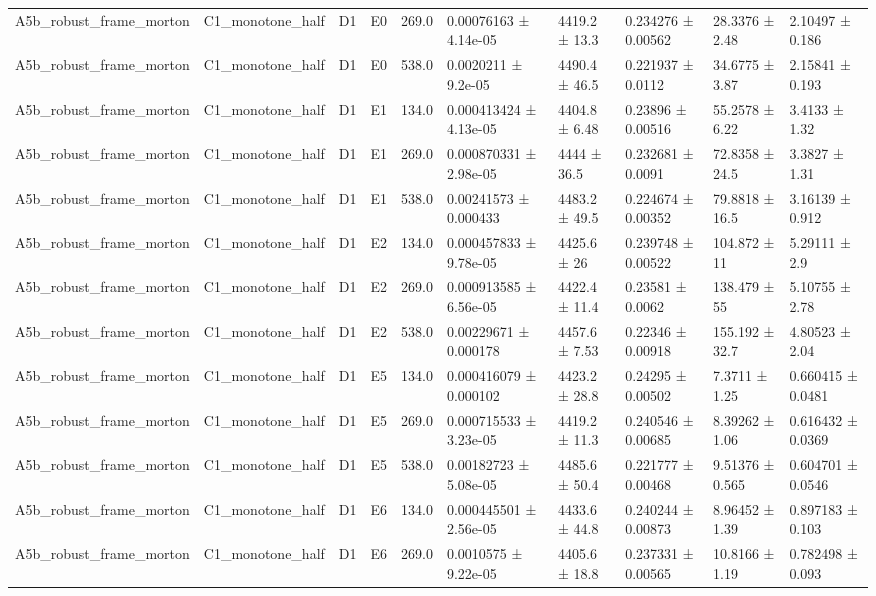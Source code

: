 \begin{table}
\begin{tabular}{llllllllll}
A5b\_robust\_frame\_morton & C1\_monotone\_half & D1 & E0 & 269.0 & 0.00076163 ± 4.14e-05 & 4419.2 ± 13.3 & 0.234276 ± 0.00562 & 28.3376 ± 2.48 & 2.10497 ± 0.186 \\
A5b\_robust\_frame\_morton & C1\_monotone\_half & D1 & E0 & 538.0 & 0.0020211 ± 9.2e-05 & 4490.4 ± 46.5 & 0.221937 ± 0.0112 & 34.6775 ± 3.87 & 2.15841 ± 0.193 \\
A5b\_robust\_frame\_morton & C1\_monotone\_half & D1 & E1 & 134.0 & 0.000413424 ± 4.13e-05 & 4404.8 ± 6.48 & 0.23896 ± 0.00516 & 55.2578 ± 6.22 & 3.4133 ± 1.32 \\
A5b\_robust\_frame\_morton & C1\_monotone\_half & D1 & E1 & 269.0 & 0.000870331 ± 2.98e-05 & 4444 ± 36.5 & 0.232681 ± 0.0091 & 72.8358 ± 24.5 & 3.3827 ± 1.31 \\
A5b\_robust\_frame\_morton & C1\_monotone\_half & D1 & E1 & 538.0 & 0.00241573 ± 0.000433 & 4483.2 ± 49.5 & 0.224674 ± 0.00352 & 79.8818 ± 16.5 & 3.16139 ± 0.912 \\
A5b\_robust\_frame\_morton & C1\_monotone\_half & D1 & E2 & 134.0 & 0.000457833 ± 9.78e-05 & 4425.6 ± 26 & 0.239748 ± 0.00522 & 104.872 ± 11 & 5.29111 ± 2.9 \\
A5b\_robust\_frame\_morton & C1\_monotone\_half & D1 & E2 & 269.0 & 0.000913585 ± 6.56e-05 & 4422.4 ± 11.4 & 0.23581 ± 0.0062 & 138.479 ± 55 & 5.10755 ± 2.78 \\
A5b\_robust\_frame\_morton & C1\_monotone\_half & D1 & E2 & 538.0 & 0.00229671 ± 0.000178 & 4457.6 ± 7.53 & 0.22346 ± 0.00918 & 155.192 ± 32.7 & 4.80523 ± 2.04 \\
A5b\_robust\_frame\_morton & C1\_monotone\_half & D1 & E5 & 134.0 & 0.000416079 ± 0.000102 & 4423.2 ± 28.8 & 0.24295 ± 0.00502 & 7.3711 ± 1.25 & 0.660415 ± 0.0481 \\
A5b\_robust\_frame\_morton & C1\_monotone\_half & D1 & E5 & 269.0 & 0.000715533 ± 3.23e-05 & 4419.2 ± 11.3 & 0.240546 ± 0.00685 & 8.39262 ± 1.06 & 0.616432 ± 0.0369 \\
A5b\_robust\_frame\_morton & C1\_monotone\_half & D1 & E5 & 538.0 & 0.00182723 ± 5.08e-05 & 4485.6 ± 50.4 & 0.221777 ± 0.00468 & 9.51376 ± 0.565 & 0.604701 ± 0.0546 \\
A5b\_robust\_frame\_morton & C1\_monotone\_half & D1 & E6 & 134.0 & 0.000445501 ± 2.56e-05 & 4433.6 ± 44.8 & 0.240244 ± 0.00873 & 8.96452 ± 1.39 & 0.897183 ± 0.103 \\
A5b\_robust\_frame\_morton & C1\_monotone\_half & D1 & E6 & 269.0 & 0.0010575 ± 9.22e-05 & 4405.6 ± 18.8 & 0.237331 ± 0.00565 & 10.8166 ± 1.19 & 0.782498 ± 0.093 \\

\end{tabular}
\end{table}

